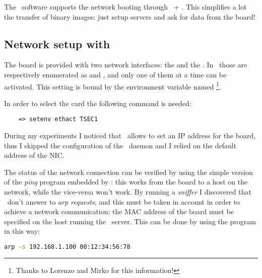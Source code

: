 The \uBoot\ software supports the network booting through \BootP\ + \TFTP.
This simplifies a lot the transfer of binary images: just setup servers
and ask for data from the board!

\subsection{ Network setup with \uBoot }

    The board is provided with two network interfaces: the
     and the . In
    \uBoot\ those are respectively enumerated as  and
    , and only one of them at a time can be
    activated. This setting is bound by the environment variable
    named \footnote{
        Thanks to Lorenzo and Mirko for this information!
    }.

    In order to select the  card the following
    command is needed:
\begin{lstlisting}
    => setenv ethact TSEC1
\end{lstlisting}


    During my experiments I noticed that \uBoot\ allows to set an
    IP address for the board, thus I skipped the configuration of
    the \BootP\ daemon and I relied on the default address of the
    NIC.

    The status of the network connection can be verified by using
    the simple version of the \emph{ping} program embedded by
    \uBoot: this works from the board to a host on the network,
    while the vice-versa won't work. By running a \emph{sniffer}
    I discovered that \uBoot\ don't answer to \emph{arp
    requests}, and this must be taken in account in order to
    achieve a network communication: the MAC address of the board
    must be specified on the host running the \TFTP\ server. This
    can be done by using the  program in this way:
\begin{lstlisting}[language=bash]
    arp -s 192.168.1.100 00:12:34:56:78
\end{lstlisting}

